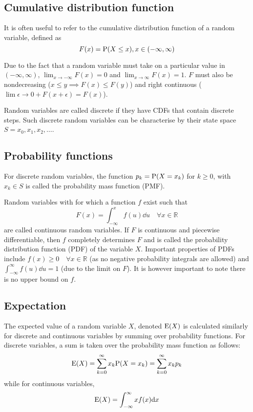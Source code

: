 \subsection{Cumulative distribution function}
It is often useful to refer to the cumulative distribution function of a random variable, defined as 
\begin{equation}
  \label{eq:cdf}
  F(x) = \mathrm{P}(X \leq x), x \in (-\infty,\infty)
\end{equation}

Due to the fact that a random variable must take on a particular value in $(-\infty,\infty)$, $\lim_{x \to -\infty} F(x) = 0$ and $\lim_{x \to \infty} F(x) = 1$.
$F$ must also be nondecreasing ($x \leq y \implies F(x) \leq F(y)$) and right continuous ($\lim{\epsilon \to 0+} F(x+\epsilon) = F(x)$).

Random variables are called discrete if they have CDFs that contain discrete steps.  
Such discrete random variables can be characterise by their state space $S = {x_0, x_1, x_2, \dots}$.

\subsection{Probability functions}
For discrete random variables, the function $p_k = \mathrm{P}(X=x_k)$ for $k \geq 0$, with $x_k \in S$ is called the probability mass function (PMF).

Random variables with for which a function $f$ exist such that 
\begin{equation}
  \label{eq:cdffrompdf}
  F(x) = \int_{-\infty}^xf(u)\dd u \quad \forall x \in \mathbb{R}
\end{equation}
are called continuous random variables.
If $F$ is continuous and piecewise differentiable, then $f$ completely determines $F$ and is called the probability distribution function (PDF) of the variable $X$.
Important properties of PDFs include $f(x) \geq 0 \quad \forall x \in \mathbb{R}$ (as no negative probability integrals are allowed) and $\int_{-\infty}^{\infty} f(u) \dd u = 1$ (due to the limit on $F$).  
It is however important to note there is no upper bound on $f$.

\subsection{Expectation}
The expected value of a random variable $X$, denoted $\mathrm{E}(X)$ is calculated similarly for discrete and continuous variables by summing over probability functions.  
For discrete variables, a sum is taken over the probability mass function as follows:
\begin{equation}
  \label{eq:discreteexpectation}
  \mathrm{E}(X) = \sum_{k=0}^{\infty} x_k\mathrm{P}(X = x_k) = \sum_{k=0}^{\infty} x_kp_k
\end{equation}
while for continuous variables,
\begin{equation}
  \label{eq:continuousexpectation}
  \mathrm{E}(X) = \int_{-\infty}^{\infty}xf(x) \mathrm{d} x
\end{equation}

